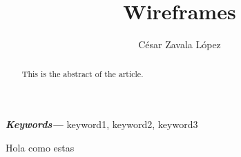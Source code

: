 \documentclass{article}
\date{}
\title{Wireframes}
\author[1,*]{César Zavala López \orcidlink{0000-1111-1111-2222}}
\affil[1]{Universidad Politécnica de victoria}
\providecommand{\keywords}[1]
{
  \small  
  \textbf{\textit{Keywords---}} #1
}
\begin{document}
\maketitle
\begin{abstract}
This is the abstract of the article.
\end{abstract}
\keywords{keyword1, keyword2, keyword3}
Hola
como estas
\end{document}
